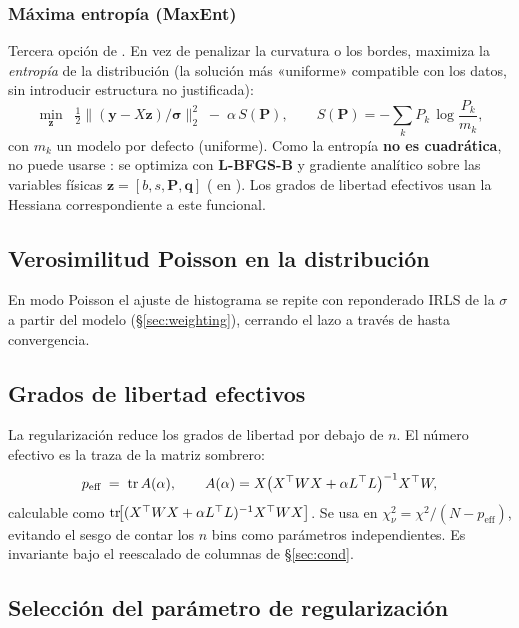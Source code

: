 \subsubsection{Máxima entropía (MaxEnt)}
Tercera opción de . En vez de penalizar la curvatura o los bordes,
maximiza la \emph{entropía} de la distribución (la solución más «uniforme»
compatible con los datos, sin introducir estructura no justificada):
\begin{equation}
  \min_{\bm z}\;\;\tfrac12\bigl\lVert (\bm y-X\bm z)/\bm\sigma\bigr\rVert_2^2
  \;-\; \alpha\,S(\bm P),\qquad
  S(\bm P) = -\sum_k P_k\,\log\!\frac{P_k}{m_k},
\end{equation}
con $m_k$ un modelo por defecto (uniforme). Como la entropía \textbf{no es
cuadrática}, no puede usarse : se optimiza con \textbf{L-BFGS-B}
y gradiente analítico sobre las variables físicas $\bm z=[b,s,\bm P,\bm q]$
( en ). Los grados de
libertad efectivos usan la Hessiana correspondiente a este funcional.

\subsection{Verosimilitud Poisson en la distribución}
En modo Poisson el ajuste de histograma se repite con reponderado IRLS de la
$\sigma$ a partir del modelo (\S\ref{sec:weighting}), cerrando el lazo a través de
 hasta convergencia.

\subsection{Grados de libertad efectivos}\label{sec:effdof}

La regularización reduce los grados de libertad por debajo de $n$. El número
efectivo es la traza de la matriz sombrero:
\begin{equation}
  p_{\text{eff}} \;=\; \operatorname{tr} A(\alpha),\qquad
  A(\alpha)=X\bigl(X^\top W X+\alpha L^\top L\bigr)^{-1}X^\top W,
  \label{eq:effdof}
\end{equation}
calculable como $\operatorname{tr}\!\bigl[(X^\top WX+\alpha L^\top L)^{-1}X^\top WX\bigr]$. Se usa
en $\chi^2_\nu=\chi^2/(N-p_{\text{eff}})$, evitando el sesgo de contar los $n$
bins como parámetros independientes. Es invariante bajo el reescalado de
columnas de \S\ref{sec:cond}.

\subsection{Selección del parámetro de regularización}\label{sec:alpha}

